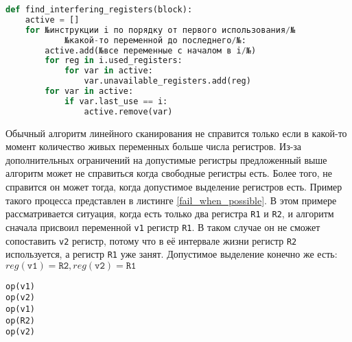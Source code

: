 \documentclass[a4paper,14pt]{extarticle}
\begin{document}
\begin{lstlisting}[caption={Поиск недопустимых регистров}, label=interf_find, float, language=Python]
def find_interfering_registers(block):
    active = []
    for №инструкции i по порядку от первого использования/№
            №какой-то переменной до последнего/№:
        active.add(№все переменные с началом в i/№)
        for reg in i.used_registers:
            for var in active:
                var.unavailable_registers.add(reg)
        for var in active:
            if var.last_use == i:
                active.remove(var)
\end{lstlisting}

Обычный алгоритм линейного сканирования не справится только если в какой-то момент количество живых переменных больше числа регистров.
Из-за дополнительных ограничений на допустимые регистры предложенный выше алгоритм может не справиться когда свободные регистры есть.
Более того, не справится он может тогда, когда допустимое выделение регистров есть.
Пример такого процесса представлен в листинге \ref{fail_when_possible}.
В этом примере рассматривается ситуация, когда есть только два регистра \texttt{R1} и \texttt{R2}, и алгоритм сначала присвоил переменной \texttt{v1} регистр \texttt{R1}.
В таком случае он не сможет сопоставить \texttt{v2} регистр, потому что в её интервале жизни регистр \texttt{R2} используется, а регистр \texttt{R1} уже занят.
Допустимое выделение конечно же есть: $reg(\texttt{v1}) = \texttt{R2}, reg(\texttt{v2}) = \texttt{R1}$

\begin{lstlisting}[caption={Пример кода, в котором алгоритм может не справится}, label=fail_when_possible, float=b]
op(v1)
op(v2)
op(v1)
op(R2)
op(v2)
\end{lstlisting}
\end{document}
